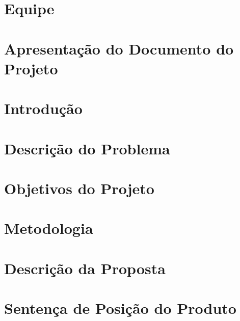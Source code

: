 \section{Equipe} %
\label{sec:introdu_o}
 

\section{Apresentação do Documento do Projeto} %
\label{sec:introdu_o}
 

\section{Introdução} %
\label{sec:introdu_o}
 

\section{Descrição do Problema} %
\label{sec:fundamentacao}
 

% 

\section{Objetivos do Projeto} %
\label{sec:introdu_o}
 

\section{Metodologia} %
\label{sec:metodologia}
 

\section{Descrição da Proposta} %
\label{sec:proposta}
 

\section{Sentença de Posição do Produto}
\label{sec:posicao}


